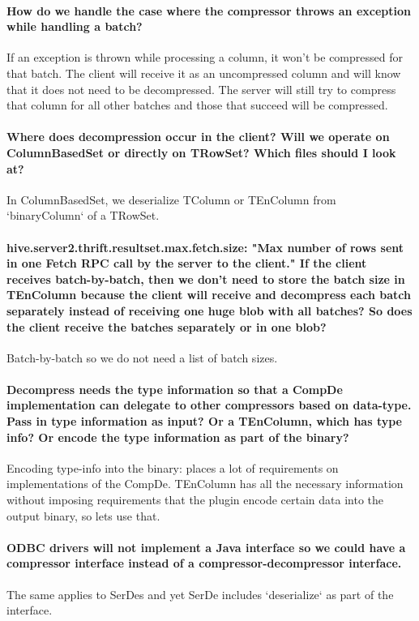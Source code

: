 \documentclass[11pt,a4paper]{article}
\begin{document}
	\paragraph{How do we handle the case where the compressor throws an exception while handling a batch?}
	If an exception is thrown while processing a column, it won't be compressed for that batch. The client will receive it as an uncompressed column and will know that it does not need to be decompressed. The server will still try to compress that column for all other batches and those that succeed will be compressed.
	
	\paragraph{Where does decompression occur in the client? Will we operate on ColumnBasedSet or directly on TRowSet? Which files should I look at?}
	In ColumnBasedSet, we deserialize TColumn or TEnColumn from `binaryColumn` of a TRowSet.
	
	\paragraph{hive.server2.thrift.resultset.max.fetch.size: "Max number of rows sent in one Fetch RPC call by the server to the client." If the client receives batch-by-batch, then we don't need to store the batch size in TEnColumn because the client will receive and decompress each batch separately instead of receiving one huge blob with all batches? So does the client receive the batches separately or in one blob?}
	Batch-by-batch so we do not need a list of batch sizes.
	
	\paragraph{Decompress needs the type information so that a CompDe implementation can delegate to other compressors based on data-type. Pass in type information as input? Or a TEnColumn, which has type info? Or encode the type information as part of the binary?}
	Encoding type-info into the binary: places a lot of requirements on implementations of the CompDe. TEnColumn has all the necessary information without imposing requirements that the plugin encode certain data into the output binary, so lets use that.
	
	\paragraph{ODBC drivers will not implement a Java interface so we could have a compressor interface instead of a compressor-decompressor interface.}
	The same applies to SerDes and yet SerDe includes `deserialize` as part of the interface.
	
\end{document}
